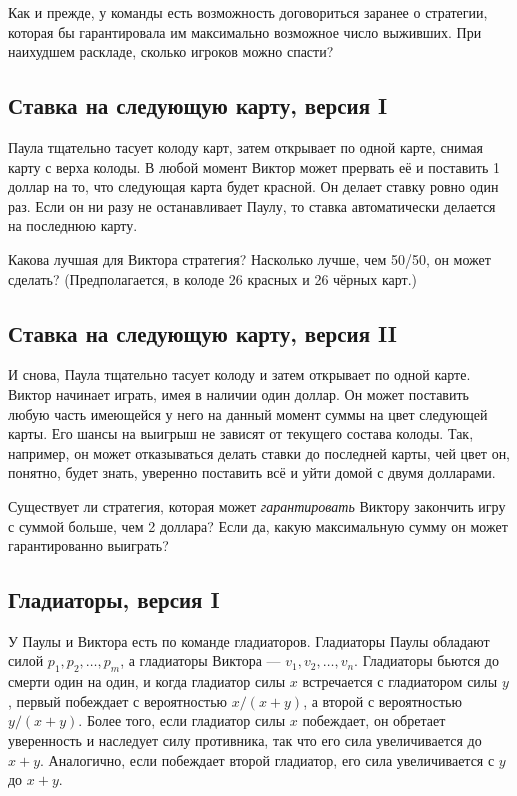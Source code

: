 \medskip

Как и прежде, у команды есть возможность договориться заранее о стратегии, которая бы гарантировала им максимально возможное число выживших.
При наихудшем раскладе, сколько игроков можно спасти?

\subsection*{Ставка на следующую карту, версия I} %

Паула тщательно тасует колоду карт, затем открывает по одной карте, снимая карту с верха колоды.
В любой момент Виктор может прервать её и поставить 1 доллар на то, что следующая карта будет красной.
Он делает ставку ровно один раз.
Если он ни разу не останавливает Паулу, то ставка автоматически делается на последнюю карту.

\medskip

Какова лучшая для Виктора стратегия?
Насколько лучше, чем 50/50, он может сделать? %
(Предполагается, в колоде 26 красных и 26 чёрных карт.)

\subsection*{Ставка на следующую карту, версия II} %

И снова, Паула тщательно тасует колоду и затем открывает по одной карте.
Виктор начинает играть, имея в наличии один доллар.
Он может поставить  любую часть имеющейся у него на данный момент суммы на цвет следующей карты.
Его шансы на выигрыш не зависят от текущего состава колоды.
Так, например, он может отказываться делать ставки до последней карты, чей цвет он, понятно, будет знать, уверенно поставить всё и уйти домой с двумя долларами.

\medskip

Существует ли стратегия, которая может \emph{гарантировать} Виктору закончить игру с суммой больше, чем 2 доллара?
Если да, какую максимальную сумму он может гарантированно выиграть? 

\subsection*{Гладиаторы, версия I} %

У Паулы и Виктора есть по команде гладиаторов.
Гладиаторы Паулы обладают силой $p_1, p_2,\dots, p_m$, а гладиаторы Виктора --- $v_1, v_2,\dots, v_n$.
Гладиаторы бьются до смерти один на один, и когда гладиатор силы $x$ встречается с гладиатором силы $y$, первый побеждает с вероятностью $x/(x+y)$, а второй с вероятностью $y/(x+y)$.
Более того, если гладиатор силы $x$ побеждает, он обретает уверенность и наследует силу противника, так что его сила увеличивается до $x+y$.
Аналогично, если побеждает второй гладиатор, его сила увеличивается с $y$ до $x+y$.

